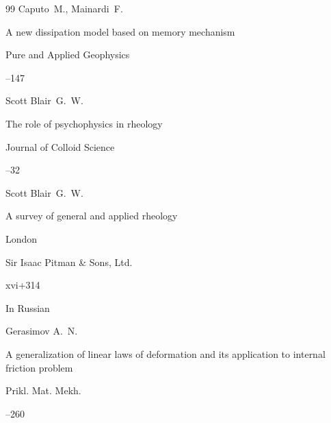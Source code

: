 \begin{thebibliography}{99}
\by Caputo~M., Mainardi~F.

\paper A new dissipation model based on memory mechanism

\jour   Pure and Applied Geophysics




--147





\by Scott Blair~G.~W.

\paper The role of psychophysics in rheology

\jour  Journal of Colloid Science




--32





\by Scott Blair~G.~W.

\book A survey of general and applied rheology

\publaddr London

\publ Sir Isaac Pitman \& Sons, Ltd.

\totalpages xvi+314 








\lang In Russian

\by Gerasimov A.~N.

\paper A generalization of linear laws of deformation and its application to internal friction problem

\jour  Prikl. Mat. Mekh. 




--260









\end{thebibliography}
